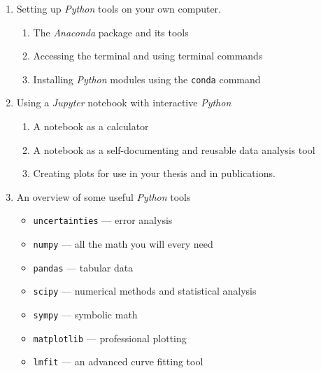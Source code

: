 \documentclass{tufte-handout}
\begin{document}
\begin{enumerate}

\item Setting up \textit{Python} tools on your own computer. 

\begin{enumerate}

\item The \textit{Anaconda} package and its tools

\item Accessing the terminal and using terminal commands

\item Installing \textit{Python} modules using the \texttt{conda} command

\end{enumerate}

\item Using a \textit{Jupyter} notebook with interactive \textit{Python}

\begin{enumerate}

\item A notebook as a calculator

\item A notebook as a self-documenting and reusable data analysis tool

\item Creating plots for use in your thesis and in publications.

\end{enumerate}

\item An overview of some useful \textit{Python} tools

\begin{itemize}
\item \texttt{uncertainties} --- error analysis
\item \texttt{numpy} --- all the math you will every need
\item \texttt{pandas} --- tabular data
\item \texttt{scipy} --- numerical methods and statistical analysis
\item \texttt{sympy} --- symbolic math
\item \texttt{matplotlib} --- professional plotting
\item \texttt{lmfit} --- an advanced curve fitting tool 

\end{itemize}

\end{enumerate}



\nobibliography{}
\end{document}
